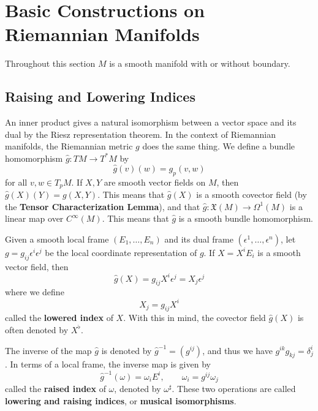 \documentclass[../main.tex]{subfiles}
\begin{document}
\section{Basic Constructions on Riemannian Manifolds}
Throughout this section $M$ is a smooth manifold with or without boundary.

\subsection{Raising and Lowering Indices}
An inner product gives a natural isomorphism between a vector space and its dual by the Riesz representation theorem. In the context of Riemannian manifolds, the Riemannian metric $g$ does the same thing. We define a bundle homomorphism $\hat{g}: TM \to T^*M$ by
\begin{equation}
	\hat{g}(v)(w) = g_p(v, w)
\end{equation}
for all $v, w \in T_pM$. If $X,Y$ are smooth vector fields on $M$, then $\hat{g}(X)(Y) = g(X, Y)$. This means that $\hat{g}(X)$ is a smooth covector field (by the \textbf{Tensor Characterization Lemma}), and that $\hat{g}: \mathfrak{X}(M) \to \Omega^1(M)$ is a linear map over $C^\infty(M)$. This means that $\hat{g}$ is a smooth bundle homomorphism.

Given a smooth local frame $(E_1, \ldots, E_n)$ and its dual frame $(\epsilon^1, \ldots, \epsilon^n)$, let $g = g_{ij} \epsilon^i \epsilon^j$ be the local coordinate representation of $g$. If $X = X^i E_i$ is a smooth vector field, then
\begin{equation}
	\hat{g}(X) = g_{ij} X^i \epsilon^j = X_j \epsilon^j
\end{equation}
where we define
\begin{equation}
	X_j = g_{ij} X^i
\end{equation}
called the \textbf{lowered index} of $X$. With this in mind, the covector field $\hat{g}(X)$ is often denoted by $X^\flat$.

The inverse of the map $\hat{g}$ is denoted by $\hat{g}^{-1} = (g^{ij})$, and thus we have $g^{ik} g_{kj} = \delta^i_j$. In terms of a local frame, the inverse map is given by
\begin{equation}
	\hat{g}^{-1}(\omega) = \omega_i E^i, \qquad \omega_i = g^{ij} \omega_j
\end{equation}
called the \textbf{raised index} of $\omega$, denoted by $\omega^\sharp$. These two operations are called \textbf{lowering and raising indices}, or \textbf{musical isomorphisms}.
\end{document}
